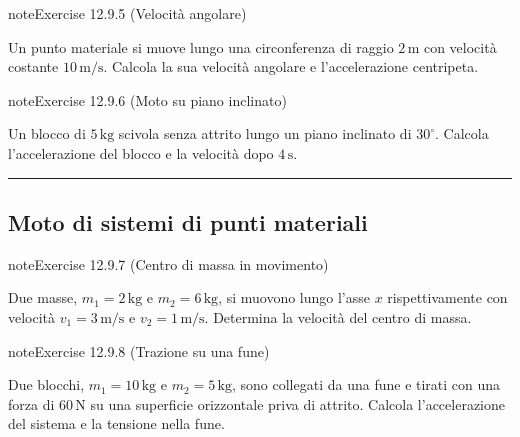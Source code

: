 \documentclass[letterpaper,10pt,italian]{jupyterBook}
\begin{document}
\begin{sphinxadmonition}{note}{Exercise 12.9.5 (Velocità angolare)}



\sphinxAtStartPar
Un punto materiale si muove lungo una circonferenza di raggio \(2 \, \text{m}\) con velocità costante \(10 \, \text{m/s}\). Calcola la sua velocità angolare e l’accelerazione centripeta.
\end{sphinxadmonition}
 \label{exercise:ch/mechanics/dynamics-problems-exercise-5}

\begin{sphinxadmonition}{note}{Exercise 12.9.6 (Moto su piano inclinato)}



\sphinxAtStartPar
Un blocco di \(5 \, \text{kg}\) scivola senza attrito lungo un piano inclinato di \(30^\circ\). Calcola l’accelerazione del blocco e la velocità dopo \(4 \, \text{s}\).
\end{sphinxadmonition}


\bigskip\hrule\bigskip



\subsection{Moto di sistemi di punti materiali}
\label{\detokenize{ch/mechanics/dynamics-problems:moto-di-sistemi-di-punti-materiali}} \label{exercise:ch/mechanics/dynamics-problems-exercise-6}

\begin{sphinxadmonition}{note}{Exercise 12.9.7 (Centro di massa in movimento)}



\sphinxAtStartPar
Due masse, \(m_1 = 2 \, \text{kg}\) e \(m_2 = 6 \, \text{kg}\), si muovono lungo l’asse \(x\) rispettivamente con velocità \(v_1 = 3 \, \text{m/s}\) e \(v_2 = 1 \, \text{m/s}\). Determina la velocità del centro di massa.
\end{sphinxadmonition}
 \label{exercise:ch/mechanics/dynamics-problems-exercise-7}

\begin{sphinxadmonition}{note}{Exercise 12.9.8 (Trazione su una fune)}



\sphinxAtStartPar
Due blocchi, \(m_1 = 10 \, \text{kg}\) e \(m_2 = 5 \, \text{kg}\), sono collegati da una fune e tirati con una forza di \(60 \, \text{N}\) su una superficie orizzontale priva di attrito. Calcola l’accelerazione del sistema e la tensione nella fune.
\end{sphinxadmonition}
 \label{exercise:ch/mechanics/dynamics-problems-exercise-8}
\end{document}
